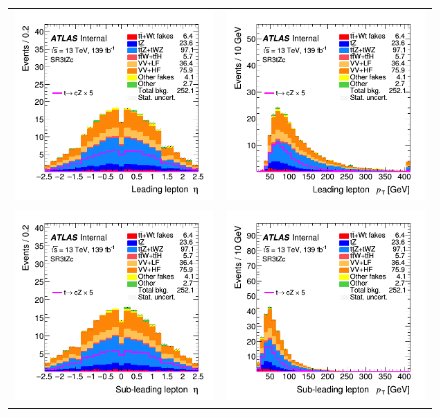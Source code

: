 \begin{figure}[!htbp]
	\centering
	\begin{tabular}{cc}
		\includegraphics[width=.45\textwidth]{Chapters/CH6/figures/SR3_UsingSMT/lep1_eta} &
		\includegraphics[width=.45\textwidth]{Chapters/CH6/figures/SR3_UsingSMT/lep1_pt} \\
		\includegraphics[width=.45\textwidth]{Chapters/CH6/figures/SR3_UsingSMT/lep2_eta} &
		\includegraphics[width=.45\textwidth]{Chapters/CH6/figures/SR3_UsingSMT/lep2_pt} \\

\end{tabular}
\end{figure}
